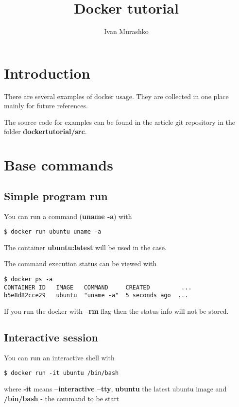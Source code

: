 \documentclass[14pt,a4paper]{article}
\title{Docker tutorial}
\author{Ivan Murashko}
\date{}
\begin{document}
\maketitle
\tableofcontents

\section*{Introduction}
There are several examples of docker usage. They are collected in one
place mainly for future references.

The source code for examples can be found in the article git
repository \cite{github:articles_ivanmurashko} in the folder 
\textbf{dockertutorial/src}.

\section{Base commands}

\subsection{Simple program run}
You can run a command (\textbf{uname -a}) with 
\begin{verbatim}
$ docker run ubuntu uname -a
\end{verbatim}
The container \textbf{ubuntu:latest} will be used in the case. 

The command execution status can be viewed with
\begin{verbatim}
$ docker ps -a 
CONTAINER ID   IMAGE   COMMAND     CREATED         ...
b5e8d82cce29   ubuntu  "uname -a"  5 seconds ago  ...
\end{verbatim}
If you run the docker with \textbf{--rm} flag then the status info
will not be stored.


\subsection{Interactive session}
You can run an interactive shell with
\begin{verbatim}
$ docker run -it ubuntu /bin/bash
\end{verbatim}
where \textbf{-it} means \textbf{--interactive --tty}, 
\textbf{ubuntu} the latest ubuntu image and \textbf{/bin/bash} - the
command to be start 
\end{document}
